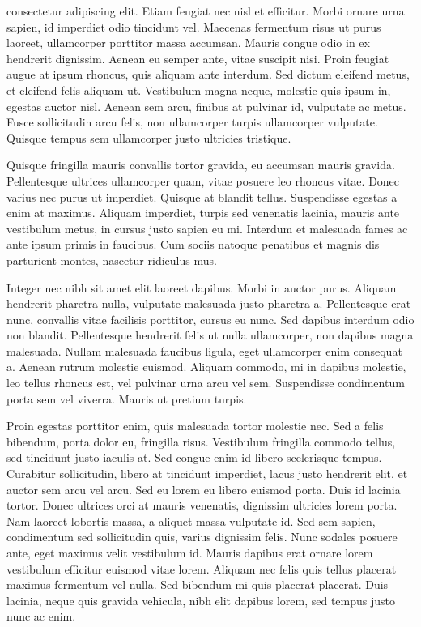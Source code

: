 
consectetur adipiscing elit. Etiam feugiat nec nisl et efficitur. Morbi ornare urna sapien, id imperdiet odio tincidunt vel. Maecenas fermentum risus ut purus laoreet, ullamcorper porttitor massa accumsan. Mauris congue odio in ex hendrerit dignissim. Aenean eu semper ante, vitae suscipit nisi. Proin feugiat augue at ipsum rhoncus, quis aliquam ante interdum. Sed dictum eleifend metus, et eleifend felis aliquam ut. Vestibulum magna neque, molestie quis ipsum in, egestas auctor nisl. Aenean sem arcu, finibus at pulvinar id, vulputate ac metus. Fusce sollicitudin arcu felis, non ullamcorper turpis ullamcorper vulputate. Quisque tempus sem ullamcorper justo ultricies tristique.

Quisque fringilla mauris convallis tortor gravida, eu accumsan mauris gravida. Pellentesque ultrices ullamcorper quam, vitae posuere leo rhoncus vitae. Donec varius nec purus ut imperdiet. Quisque at blandit tellus. Suspendisse egestas a enim at maximus. Aliquam imperdiet, turpis sed venenatis lacinia, mauris ante vestibulum metus, in cursus justo sapien eu mi. Interdum et malesuada fames ac ante ipsum primis in faucibus. Cum sociis natoque penatibus et magnis dis parturient montes, nascetur ridiculus mus.

Integer nec nibh sit amet elit laoreet dapibus. Morbi in auctor purus. Aliquam hendrerit pharetra nulla, vulputate malesuada justo pharetra a. Pellentesque erat nunc, convallis vitae facilisis porttitor, cursus eu nunc. Sed dapibus interdum odio non blandit. Pellentesque hendrerit felis ut nulla ullamcorper, non dapibus magna malesuada. Nullam malesuada faucibus ligula, eget ullamcorper enim consequat a. Aenean rutrum molestie euismod. Aliquam commodo, mi in dapibus molestie, leo tellus rhoncus est, vel pulvinar urna arcu vel sem. Suspendisse condimentum porta sem vel viverra. Mauris ut pretium turpis.

Proin egestas porttitor enim, quis malesuada tortor molestie nec. Sed a felis bibendum, porta dolor eu, fringilla risus. Vestibulum fringilla commodo tellus, sed tincidunt justo iaculis at. Sed congue enim id libero scelerisque tempus. Curabitur sollicitudin, libero at tincidunt imperdiet, lacus justo hendrerit elit, et auctor sem arcu vel arcu. Sed eu lorem eu libero euismod porta. Duis id lacinia tortor. Donec ultrices orci at mauris venenatis, dignissim ultricies lorem porta. Nam laoreet lobortis massa, a aliquet massa vulputate id. Sed sem sapien, condimentum sed sollicitudin quis, varius dignissim felis. Nunc sodales posuere ante, eget maximus velit vestibulum id. Mauris dapibus erat ornare lorem vestibulum efficitur euismod vitae lorem. Aliquam nec felis quis tellus placerat maximus fermentum vel nulla. Sed bibendum mi quis placerat placerat. Duis lacinia, neque quis gravida vehicula, nibh elit dapibus lorem, sed tempus justo nunc ac enim.

